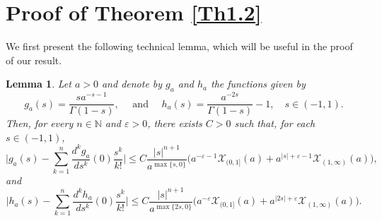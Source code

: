\documentclass[10pt, a4paper, reqno]{amsart}
\newtheorem{lem}[thm]{Lemma}
\theoremstyle{definition}
\theoremstyle{remark}
\numberwithin{equation}{section}
\begin{document}
\section{Proof of Theorem \ref{Th1.2}}
We first present the following technical lemma, which will be useful in the proof of our result.
 \begin{lem}\label{techn}
Let $a>0$ and denote by $g_a$ and $h_a$ the functions given by
\[
g_a(s)=\frac{sa^{-s-1}}{\Gamma (1-s)},\quad \mbox{ and }\quad h_a(s)=\frac{a^{-2s}}{\Gamma (1-s)}-1, \quad s\in (-1,1).
\]
Then, for every $n\in \mathbb N$ and $\varepsilon >0$, there exists $C>0$ such that, for each $s\in (-1,1)$,
\[
\Big|g_a(s)-\sum_{k=1}^n\frac{d^kg_a}{ds^k}(0)\frac{s^k}{k!}\Big|\leq C\frac{|s|^{n+1}}{a^{\max\{s,0\}}}\Big(a^{-\varepsilon -1}\mathcal X_{(0,1]}(a)+a^{|s|+\varepsilon -1}\mathcal X_{(1,\infty)}(a)\Big),
\]
and 
\[
 \Big|h_a(s)-\sum_{k=1}^n\frac{d^kh_a}{ds^k}(0)\frac{s^k}{k!}\Big|\leq C\frac{|s|^{n+1}}{a^{\max\{2s,0\}}}\Big(a^{-\varepsilon}\mathcal X_{(0,1]}(a)+a^{|2s|+\varepsilon}\mathcal X_{(1,\infty)}(a)\Big).
\]
\end{lem}
\end{document}
